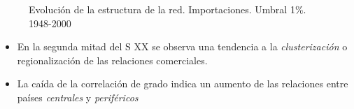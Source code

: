 \documentclass[compress]{beamer}
\begin{document}
\begin{frame}
\begin{figure}
	
	\centering
	\caption*{\scriptsize Evolución de la estructura de la red. Importaciones. Umbral 1\%. 1948-2000}
	\label{fig:metricas_LP}
\end{figure}

\small
\begin{itemize}[label=\faRebel]
	\item En la segunda mitad del S XX se observa una tendencia a la \textit{clusterización } o regionalización de las relaciones comerciales.
	\item La caída de la correlación de grado indica un aumento de las relaciones entre países \textit{centrales} y \textit{periféricos}
\end{itemize}



\end{frame}
\end{document}
